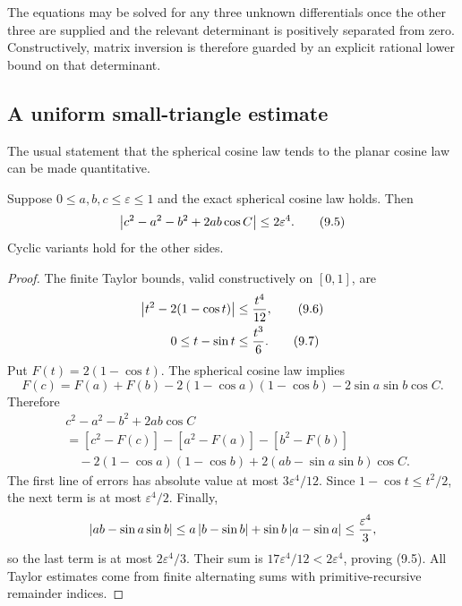 The equations may be solved for any three unknown differentials once the other
three are supplied and the relevant determinant is positively separated from
zero.  Constructively, matrix inversion is therefore guarded by an explicit
rational lower bound on that determinant.

\subsection{A uniform small-triangle estimate}

The usual statement that the spherical cosine law tends to the planar cosine
law can be made quantitative.

\begin{theorem}
\label{thm:planar-limit}
Suppose
\(0\le a,b,c\le\varepsilon\le1\) and the exact spherical cosine law holds.
Then
\begin{equation}
 \left|c^2-a^2-b^2+2ab\cos C\right|\le2\varepsilon^4.             \tag{9.5}
\end{equation}
Cyclic variants hold for the other sides.
\end{theorem}

\begin{proof}
The finite Taylor bounds, valid constructively on \([0,1]\), are
\begin{align}
 \left|t^2-2(1-\cos t)\right|&\le\frac{t^4}{12},                 \tag{9.6}\\
 0\le t-\sin t&\le\frac{t^3}{6}.                          \tag{9.7}
\end{align}
Put \(F(t)=2(1-\cos t)\).  The spherical cosine law implies
\begin{equation}
 F(c)=F(a)+F(b)-2(1-\cos a)(1-\cos b)-2\sin a\sin b\cos C.
                                                                    \tag{9.8}
\end{equation}
Therefore
\begin{align*}
 &c^2-a^2-b^2+2ab\cos C\\
 &=[c^2-F(c)]-[a^2-F(a)]-[b^2-F(b)]\\
 &\quad-2(1-\cos a)(1-\cos b)
       +2(ab-\sin a\sin b)\cos C.
\end{align*}
The first line of errors has absolute value at most
\(3\varepsilon^4/12\).  Since \(1-\cos t\le t^2/2\), the next term is at most
\(\varepsilon^4/2\).  Finally,
\[
 \left|ab-\sin a\sin b\right|
 \le a\left|b-\sin b\right|+\sin b\left|a-\sin a\right|
 \le\frac{\varepsilon^4}{3},
\]
so the last term is at most \(2\varepsilon^4/3\).  Their sum is
\(17\varepsilon^4/12<2\varepsilon^4\), proving (9.5).
All Taylor estimates come from finite alternating sums with primitive-recursive
remainder indices.
\end{proof}

